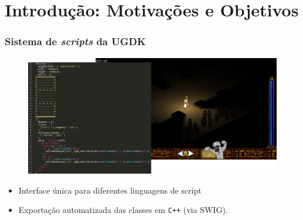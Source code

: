\documentclass[brazil]{beamer}
\begin{document}
\section{Introdução: Motivações e Objetivos}
\begin{frame}[fragile]
  \frametitle{Sistema de \textit{scripts} da UGDK}
  \pause
  \begin{figure}
    \includegraphics[width=.9\textwidth]{images/horus+sublime.png}
  \end{figure}
  \vspace{-10pt}
  \begin{itemize}
    \pause
    \item Interface única para diferentes linguagens de script
    \pause
    \item Exportação automatizada das classes em \texttt{C++} (via SWIG).
  \end{itemize}
\end{frame}
\end{document}
